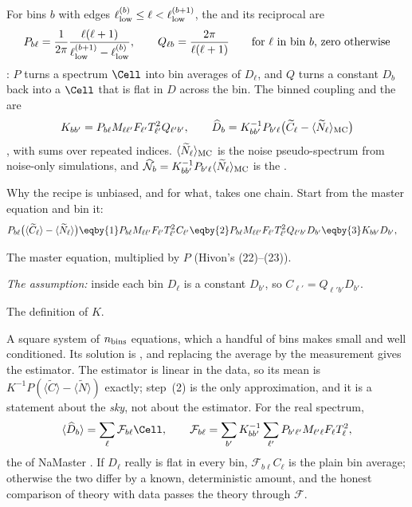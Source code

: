 \begin{workdef}
For bins $b$ with edges $\ell^{(b)}_{\rm low}\le\ell<\ell^{(b+1)}_{\rm low}$, the  and its
reciprocal are
\[
  P_{b\ell}=\frac1{2\pi}\frac{\ell(\ell+1)}{\ell^{(b+1)}_{\rm low}-\ell^{(b)}_{\rm low}},\qquad
  Q_{\ell b}=\frac{2\pi}{\ell(\ell+1)}
  \qquad\text{for $\ell$ in bin $b$, zero otherwise}
\]
: $P$ turns a spectrum $\Cell$ into bin averages of $D_\ell$, and $Q$ turns a
constant $D_b$ back into a $\Cell$ that is flat in $D$ across the bin. The binned coupling and the
 are
\[
  K_{bb'}=P_{b\ell}M_{\ell\ell'}F_{\ell'}T_{\ell'}^2Q_{\ell'b'},\qquad
  \widehat D_b=K^{-1}_{bb'}P_{b'\ell}\bigl(\widetilde C_\ell-\langle\widetilde N_\ell\rangle_{\rm MC}\bigr)
\]
, with sums over repeated indices. $\langle\widetilde N_\ell\rangle_{\rm MC}$ is the
noise pseudo-spectrum from noise-only simulations, and $\widehat{\mathcal N}_b=K^{-1}_{bb'}P_{b'\ell}\langle\widetilde N_\ell\rangle_{\rm MC}$ is
the  .
\end{workdef}

Why the recipe is unbiased, and for what, takes one chain. Start from the master equation and bin it:
\begin{align}
  P_{b\ell}\bigl(\langle\widetilde C_\ell\rangle-\langle\widetilde N_\ell\rangle\bigr)
  &\eqby{1}P_{b\ell}M_{\ell\ell'}F_{\ell'}T^2_{\ell'}C_{\ell'}
   \eqby{2}P_{b\ell}M_{\ell\ell'}F_{\ell'}T^2_{\ell'}Q_{\ell'b'}D_{b'}
   \eqby{3}K_{bb'}D_{b'} ,
  \label{8b:eq:master-derivation}
\end{align}
\begin{explain}
  \item The master equation, multiplied by $P$ (Hivon's (22)--(23)).
  \item \emph{The assumption:} inside each bin $D_\ell$ is a constant $D_{b'}$, so $C_{\ell'}=Q_{\ell'b'}D_{b'}$.
  \item The definition of $K$.
\end{explain}
A square system of $n_{\rm bins}$ equations, which a handful of bins makes small and well
conditioned. Its solution is , and replacing the average by the measurement gives
the estimator. The estimator is linear in the data, so its mean is $K^{-1}P(\langle\widetilde C\rangle-\langle\widetilde N\rangle)$
exactly; step~(2) is the only approximation, and it is a statement about the \emph{sky}, not about
the estimator. For the real spectrum,
\begin{equation}
  \langle\widehat D_b\rangle=\sum_\ell\mathcal F_{b\ell}\Cell,\qquad
  \mathcal F_{b\ell}=\sum_{b'}K^{-1}_{bb'}\sum_{\ell'}P_{b'\ell'}M_{\ell'\ell}F_\ell T_\ell^2 ,
  \label{8b:eq:bpw}
\end{equation}
the  of NaMaster \cite[eqs~18--19]{Alonso2019}. If $D_\ell$ really is
flat in every bin, $\mathcal F_{b\ell}C_\ell$ is the plain bin average; otherwise the two differ by a known,
deterministic amount, and the honest comparison of theory with data passes the theory through
$\mathcal F$.

